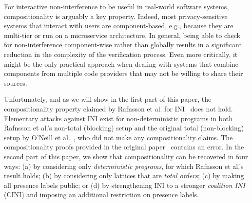 \documentclass[preprint,5p,twocolumn]{elsarticle}
\begin{document}
For interactive non-interference to be useful in real-world software systems, compositionality is arguably
a key property. Indeed, most privacy-sensitive systems that interact with users
are component-based, e.g., because they are multi-tier or run on a microservice architecture.
In general, being able to check for non-interference component-wise rather than globally results
in a significant reduction in the complexity of the verification process.
Even more critically, it might be the only practical approach when dealing with systems that
combine components from multiple code providers that may not be willing to share their sources.

Unfortunately, and as we will show in the first part of this paper, the compositionality property claimed
by Rafnsson et al. for INI~\cite[Theorem V.1]{Rafnsson2012} does not hold. Elementary attacks against
INI exist for non-deterministic programs in both Rafnsson et al.'s non-total (blocking) setup and the original
total (non-blocking) setup by O'Neill et al.~\cite{ONeill2006}, who did not make any compositionality claims.
The compositionality proofs provided in the original paper~\cite{Rafnsson2012} contains an error. In the second part of this paper,
we show that compositionality can be recovered in four ways:
(a) by considering only \emph{deterministic programs},
for which Rafnsson et al.'s result holds;
(b) by considering only lattices that are \emph{total orders};
(c) by making all presence labels public; or
(d) by strengthening INI to a stronger \emph{coalition INI} (CINI) and imposing
an additional restriction on presence labels.
\end{document}
